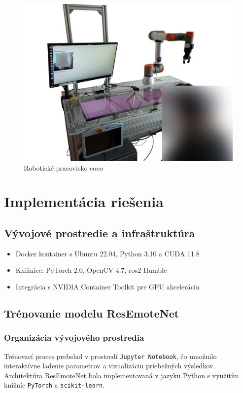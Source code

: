 \begin{figure}[h]
\centering
\includegraphics[width=1.0\textwidth]{img/cocohrip2.png}
\caption{Robotické pracovisko \gls{coco}}
\label{fig:coco}
\end{figure}

\section{Implementácia riešenia}
\label{sec:implementation}
\subsection{Vývojové prostredie a infraštruktúra}
\begin{itemize}
\item Docker kontainer s Ubuntu 22.04, Python 3.10 a CUDA 11.8
\item Knižnice: PyTorch 2.0, OpenCV 4.7, \gls{ros}2 Humble
\item Integrácia s NVIDIA Container Toolkit pre GPU akceleráciu
\end{itemize}

\subsection{Trénovanie modelu ResEmoteNet}
\subsubsection{Organizácia vývojového prostredia}
Trénovací proces prebehol v prostredí \texttt{Jupyter Notebook}, čo umožnilo interaktívne ladenie parametrov a vizualizáciu priebežných výsledkov. Architektúra ResEmoteNet bola implementovaná v jazyku Python s využitím knižníc \texttt{PyTorch} a \texttt{scikit-learn}.

